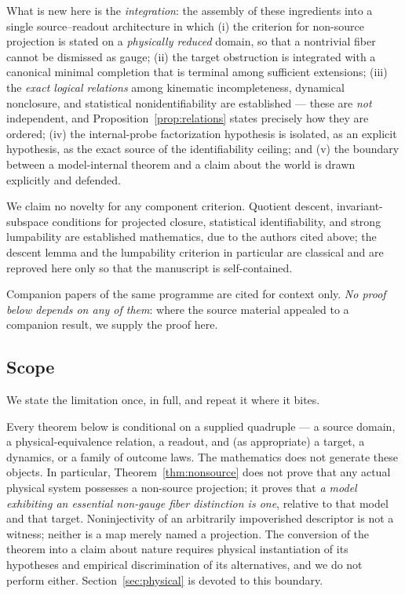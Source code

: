\documentclass[11pt,reqno]{amsart}
\theoremstyle{plain}
\theoremstyle{definition}
\theoremstyle{remark}
\begin{document}
What is new here is the \emph{integration}: the assembly of these ingredients into a single source--readout architecture in which (i) the criterion for non-source projection is stated on a \emph{physically reduced} domain, so that a nontrivial fiber cannot be dismissed as gauge; (ii) the target obstruction is integrated with a canonical minimal completion that is terminal among sufficient extensions; (iii) the \emph{exact logical relations} among kinematic incompleteness, dynamical nonclosure, and statistical nonidentifiability are established --- these are \emph{not} independent, and Proposition~\ref{prop:relations} states precisely how they are ordered; (iv) the internal-probe factorization hypothesis is isolated, as an explicit hypothesis, as the exact source of the identifiability ceiling; and (v) the boundary between a model-internal theorem and a claim about the world is drawn explicitly and defended.

We claim no novelty for any component criterion. Quotient descent, invariant-subspace conditions for projected closure, statistical identifiability, and strong lumpability are established mathematics, due to the authors cited above; the descent lemma and the lumpability criterion in particular are classical and are reproved here only so that the manuscript is self-contained.

Companion papers of the same programme \cite{Paper1,Paper2,Paper3,Paper4,Paper5} are cited for context only. \emph{No proof below depends on any of them}: where the source material appealed to a companion result, we supply the proof here.

\subsection{Scope}\label{subsec:scope}

We state the limitation once, in full, and repeat it where it bites.

Every theorem below is conditional on a supplied quadruple --- a source domain, a physical-equivalence relation, a readout, and (as appropriate) a target, a dynamics, or a family of outcome laws. The mathematics does not generate these objects. In particular, Theorem~\ref{thm:nonsource} does not prove that any actual physical system possesses a non-source projection; it proves that \emph{a model exhibiting an essential non-gauge fiber distinction is one}, relative to that model and that target. Noninjectivity of an arbitrarily impoverished descriptor is not a witness; neither is a map merely named a projection. The conversion of the theorem into a claim about nature requires physical instantiation of its hypotheses and empirical discrimination of its alternatives, and we do not perform either. Section~\ref{sec:physical} is devoted to this boundary.
\end{document}
